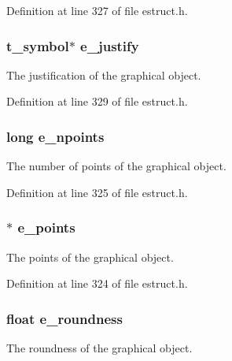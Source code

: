 Definition at line 327 of file estruct.\-h.

\hypertarget{struct__egobj_a41dc1b542ee19a3171a52480dff2c664}{
\subsubsection[{e\-\_\-justify}]{\setlength{\rightskip}{0pt plus 5cm}t\-\_\-symbol$\ast$ e\-\_\-justify}}\label{struct__egobj_a41dc1b542ee19a3171a52480dff2c664}
The justification of the graphical object. 

Definition at line 329 of file estruct.\-h.

\hypertarget{struct__egobj_a216eff6ab0216b35e215bd1c1b8fb0d0}{
\subsubsection[{e\-\_\-npoints}]{\setlength{\rightskip}{0pt plus 5cm}long e\-\_\-npoints}}\label{struct__egobj_a216eff6ab0216b35e215bd1c1b8fb0d0}
The number of points of the graphical object. 

Definition at line 325 of file estruct.\-h.

\hypertarget{struct__egobj_a579eafd42827c9bdcddc613774309ad3}{
\subsubsection[{e\-\_\-points}]{$\ast$ e\-\_\-points}}\label{struct__egobj_a579eafd42827c9bdcddc613774309ad3}
The points of the graphical object. 

Definition at line 324 of file estruct.\-h.

\hypertarget{struct__egobj_ab2c5a6f93a125c4862295e28aad05a74}{
\subsubsection[{e\-\_\-roundness}]{\setlength{\rightskip}{0pt plus 5cm}float e\-\_\-roundness}}\label{struct__egobj_ab2c5a6f93a125c4862295e28aad05a74}
The roundness of the graphical object. 

